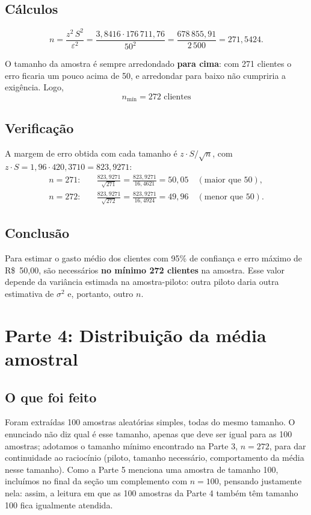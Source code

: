 \documentclass[12pt,a4paper]{article}
\begin{document}
\subsection*{Cálculos}

$$n = \frac{z^2\,S^2}{\varepsilon^2} = \frac{3{,}8416 \cdot 176\,711{,}76}{50^2} = \frac{678\,855{,}91}{2\,500} = 271{,}5424.$$

O tamanho da amostra é sempre arredondado \textbf{para cima}: com 271 clientes o erro ficaria um pouco acima de 50, e arredondar para baixo não cumpriria a exigência. Logo,
$$\boxed{n_{\text{mín}} = 272 \text{ clientes}}$$

\subsection*{Verificação}

A margem de erro obtida com cada tamanho é $z\cdot S/\sqrt{n}$, com $z\cdot S = 1{,}96 \cdot 420{,}3710 = 823{,}9271$:
\begin{align*}
n = 271:&\quad \frac{823{,}9271}{\sqrt{271}} = \frac{823{,}9271}{16{,}4621} = 50{,}05 \quad (\text{maior que } 50),\\[0.4em]
n = 272:&\quad \frac{823{,}9271}{\sqrt{272}} = \frac{823{,}9271}{16{,}4924} = 49{,}96 \quad (\text{menor que } 50).
\end{align*}

\subsection*{Conclusão}

Para estimar o gasto médio dos clientes com 95\% de confiança e erro máximo de R\$~50,00, são necessários \textbf{no mínimo 272 clientes} na amostra. Esse valor depende da variância estimada na amostra-piloto: outra piloto daria outra estimativa de $\sigma^2$ e, portanto, outro $n$.

\section{Parte 4: Distribuição da média amostral}

\subsection*{O que foi feito}

Foram extraídas 100 amostras aleatórias simples, todas do mesmo tamanho. O enunciado não diz qual é esse tamanho, apenas que deve ser igual para as 100 amostras; adotamos o tamanho mínimo encontrado na Parte 3, $n = 272$, para dar continuidade ao raciocínio (piloto, tamanho necessário, comportamento da média nesse tamanho). Como a Parte 5 menciona uma amostra de tamanho 100, incluímos no final da seção um complemento com $n = 100$, pensando justamente nela: assim, a leitura em que as 100 amostras da Parte 4 também têm tamanho 100 fica igualmente atendida.
\end{document}

